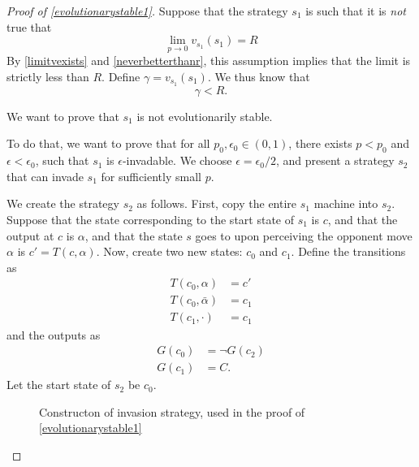 \documentclass[11pt]{amsart}
\theoremstyle{definition}
\theoremstyle{remark}
\begin{document}
    \begin{proof}[Proof of \cref{evolutionarystable1}]
      Suppose that the strategy $s_1$ is such that it is \textit{not} true that \begin{equation*}
        \lim_{p \to 0 } v_{s_1}(s_1) = R
      \end{equation*}
      By \cref{limitvexists} and \cref{neverbetterthanr}, this assumption implies that the limit is strictly less than $R$. Define $\gamma = v_{s_1}(s_1)$. We thus know that \begin{equation*}
        \gamma < R.
      \end{equation*}
      
      We want to prove that $s_1$ is not evolutionarily stable. 
      
      To do that, we want to prove that for all $p_0, \epsilon_0 \in (0,1)$, there exists $p < p_0$ and $\epsilon < \epsilon_0$, such that $s_1$ is $\epsilon$-invadable. We choose $\epsilon = \epsilon_0 / 2$, and present a strategy $s_2$ that can invade $s_1$ for sufficiently small $p$.

      We create the strategy $s_2$ as follows. First, copy the entire $s_1$ machine into $s_2$. Suppose that the state corresponding to the start state of $s_1$ is $c$, and that the output at $c$ is $\alpha$, and that the state $s$ goes to upon perceiving the opponent move $\alpha$ is $c' = T(c, \alpha)$. Now, create two new states: $c_0$ and $c_1$. Define the transitions as \begin{align*}
        T(c_0, \alpha) &= c'\\
        T(c_0, \bar{\alpha}) &= c_1 \\
        T(c_1, \cdot) &= c_1
      \end{align*}
      and the outputs as \begin{align*}
        G(c_0) &= \lnot G(c_2)\\
        G(c_1) &= C.
      \end{align*}
      Let the start state of $s_2$ be $c_0$. 

      \begin{figure}
        \centering
        \caption{Constructon of invasion strategy, used in the proof of \cref{evolutionarystable1}}
        \label{invasionstrategy}
      \end{figure}



\end{proof}
\end{document}
